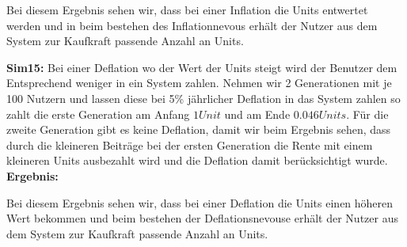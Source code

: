 \begin{table}[hbt!]
\centering
{}
\end{table}

Bei diesem Ergebnis sehen wir, dass bei einer Inflation die Units entwertet werden und in beim bestehen des Inflationnevous erhält der Nutzer aus dem System zur Kaufkraft passende Anzahl an Units.

\textbf{Sim15:} Bei einer Deflation wo der Wert der Units steigt wird der Benutzer dem Entsprechend weniger in ein System zahlen. Nehmen wir 2 Generationen mit je 100 Nutzern und lassen diese bei 5\% jährlicher Deflation in das System zahlen so zahlt die erste Generation am Anfang $1 Unit$  und am Ende $0.046 Units$. Für die zweite Generation gibt es keine Deflation, damit wir beim Ergebnis sehen, dass durch die kleineren Beiträge bei der ersten Generation die Rente mit einem kleineren Units ausbezahlt wird und die Deflation damit berücksichtigt wurde. \\

\textbf{Ergebnis:}

\begin{table}[hbt!]
\centering
{}
\end{table}

Bei diesem Ergebnis sehen wir, dass bei einer Deflation die Units einen höheren Wert bekommen und beim bestehen der Deflationsnevouse erhält der Nutzer aus dem System zur Kaufkraft passende Anzahl an Units.


